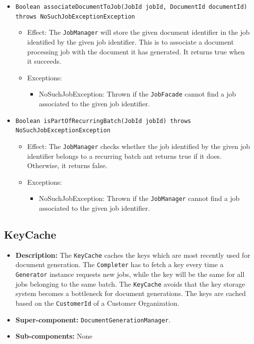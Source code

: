 \documentclass[a4paper,10pt]{article}
\begin{document}
\begin{itemize}
\begin{itemize}
    	\item \texttt{Boolean associateDocumentToJob(JobId jobId, DocumentId documentId) throws NoSuchJobExceptionException}
    	\begin{itemize}
    		\item Effect: The \texttt{JobManager} will store the given document identifier in the job identified by the given job identifier. This is to associate a document processing job with the document it has generated. It returns true when it succeeds.
    		\item Exceptions:
    		\begin{itemize}
    			\item NoSuchJobException: Thrown if the \texttt{JobFacade} cannot find a job associated to the given job identifier.
    		\end{itemize}
    	\end{itemize} 	    	

    	\item \texttt{Boolean isPartOfRecurringBatch(JobId jobId) throws NoSuchJobExceptionException}
    	\begin{itemize}
    		\item Effect: The \texttt{JobManager} checks whether the job identified by the given job identifier belongs to a recurring batch ant returns true if it does. Otherwise, it returns false.
    		\item Exceptions:
    		\begin{itemize}
    			\item NoSuchJobException: Thrown if the \texttt{JobManager} cannot find a job associated to the given job identifier.
    		\end{itemize}
    	\end{itemize}  
 
 
 	   
    \end{itemize}     
\end{itemize}

\subsection{KeyCache}
\begin{itemize}
    \item \textbf{Description:} The \texttt{KeyCache} caches the keys which are most recently used for document generation. The \texttt{Completer} has to fetch a key every time a \texttt{Generator} instance requests new jobs, while the key will be the same for all jobs belonging to the same batch. The \texttt{KeyCache} avoids that the key storage system becomes a bottleneck for document generations. The keys are cached based on the \texttt{CustomerId} of a Customer Organization.
    \item \textbf{Super-component:}  \texttt{DocumentGenerationManager}.
    \item \textbf{Sub-components:} None
\end{itemize}
\end{document}

